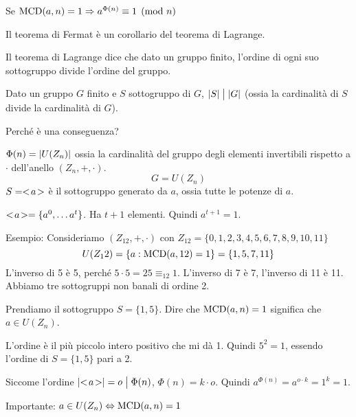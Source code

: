 Se $\operatorname{MCD}(a, n) = 1 \Rightarrow a^{\Phi(n)} \equiv 1 \pmod{n}$

Il teorema di Fermat \`e un corollario del teorema di Lagrange.

Il teorema di Lagrange dice che dato un gruppo finito, l'ordine di ogni suo sottogruppo divide l'ordine del gruppo.

Dato un gruppo $G$ finito e $S$ sottogruppo di $G$, $\left\lvert{S}\right\rvert \bigm| \left\lvert{G}\right\rvert $ (ossia la cardinalit\`a di $S$ divide la cardinalit\`a di $G$).

Perch\'e \`e una conseguenza? 

$\Phi(n) = \left\lvert{U(Z_n)}\right\rvert$ ossia la cardinalit\`a del gruppo degli elementi invertibili rispetto a $\cdot$ dell'anello $(Z_n, +, \cdot)$.
\[
G = U(Z_n)
\]
$S = <\!{a}\!>$ \`e il sottogruppo generato da $a$, ossia tutte le potenze di $a$.

$<\!{a}\!> = \{ a^0, \dots a^t \}$. Ha $t + 1$ elementi. Quindi $a^{t+1} = 1$.

Esempio:
Consideriamo $(Z_12, +, \cdot)$ con $Z_12 = \{0,1,2,3,4,5,6,7,8,9,10,11\}$
\[
U(Z_12) = \{ a : \operatorname{MCD}(a, 12) = 1\} = \{ 1, 5, 7, 11 \}
\]
L'inverso di 5 \`e 5, perch\'e $5 \cdot 5 = 25 \equiv_{12} 1$. L'inverso di 7 \`e 7, l'inverso di 11 \`e 11. Abbiamo tre sottogruppi non banali di ordine 2.

Prendiamo il sottogruppo $S = \{ 1, 5 \}$. Dire che $\operatorname{MCD}(a, n) = 1$ significa che $a \in U(Z_n)$.

L'ordine \`e il pi\`u piccolo intero positivo che mi d\`a 1. Quindi $5^2 = 1$, essendo l'ordine di $S = \{ 1, 5 \}$ pari a 2.

Siccome l'ordine $\left\lvert{<\!{a}\!>}\right\rvert = o \bigm| \Phi(n)$, $\Phi(n) = k \cdot o$. Quindi $a^{\Phi(n)} = a^{o \cdot k} = 1^k = 1$.

Importante: $a \in U(Z_n) \Leftrightarrow \operatorname{MCD}(a, n) = 1$


